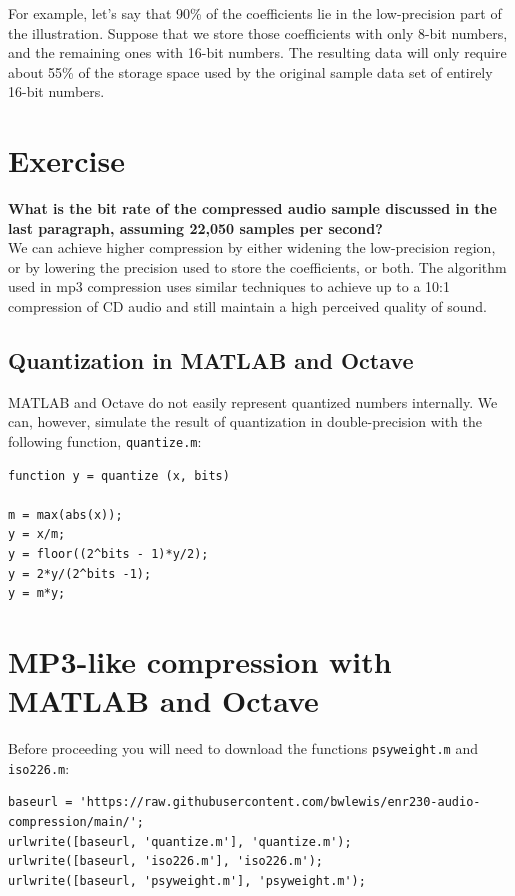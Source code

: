 \documentclass[10pt]{article}
\begin{document}
For example, let's say that 90\% of the coefficients lie in the 
low-precision part of the illustration. Suppose that we store those
coefficients with only 8-bit numbers, and the remaining ones with
16-bit numbers. The resulting data will only require about 55\% of the
storage space used by the original sample data set of entirely 16-bit
numbers.
\section*{Exercise}
{\bf What is the bit rate of the compressed audio sample discussed in the
last paragraph, assuming 22,050 samples per second?}
\\[8pt]
We can achieve higher compression by either widening the low-precision
region, or by lowering the precision used to store the coefficients, or
both. The algorithm used in mp3 compression uses similar techniques to
achieve up to a 10:1 compression of CD audio and still maintain a high
perceived quality of sound.

\subsection*{Quantization in MATLAB and Octave}

MATLAB and Octave do not easily represent quantized numbers internally. 
We can, however, simulate the result of quantization in double-precision
with the following function, {\tt quantize.m}:
\begin{verbatim}
function y = quantize (x, bits)

m = max(abs(x));
y = x/m;
y = floor((2^bits - 1)*y/2);
y = 2*y/(2^bits -1);
y = m*y;

\end{verbatim}



\section*{MP3-like compression with MATLAB and Octave}

Before proceeding you will need to download the functions \verb+psyweight.m+
and \verb+iso226.m+:

\begin{verbatim}
baseurl = 'https://raw.githubusercontent.com/bwlewis/enr230-audio-compression/main/';
urlwrite([baseurl, 'quantize.m'], 'quantize.m');
urlwrite([baseurl, 'iso226.m'], 'iso226.m');
urlwrite([baseurl, 'psyweight.m'], 'psyweight.m');
\end{verbatim}
\end{document}
